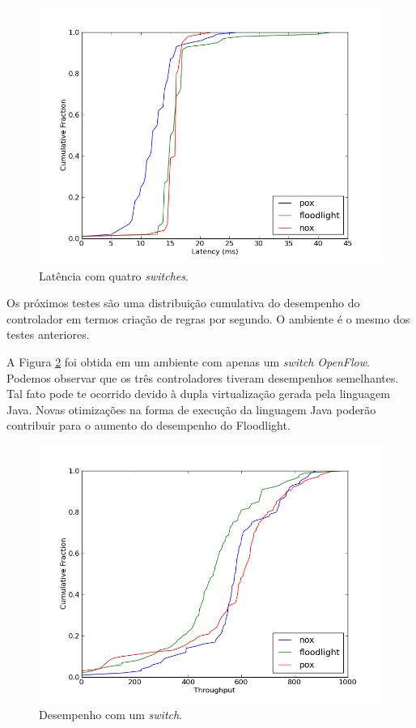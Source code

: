 \begin{figure}[h]
\centering
\includegraphics[width=140mm]{latencia_4sw.png}
\caption{Latência com quatro \textit{switches}.}
\label{fig:latencia4sw} 
\end{figure}

Os próximos testes são uma distribuição cumulativa do
desempenho do controlador em termos criação de regras por
segundo. O ambiente é o mesmo dos testes anteriores.

A Figura \ref{fig:desempenho1sw} foi obtida em um ambiente
com apenas um \textit{switch OpenFlow}. Podemos observar 
que os três controladores tiveram desempenhos semelhantes.
Tal fato pode te ocorrido devido à dupla virtualização gerada
pela linguagem Java. Novas otimizações na forma de execução
da linguagem Java poderão contribuir para o aumento do 
desempenho do Floodlight.

\begin{figure}[h]
\centering
\includegraphics[width=140mm]{desempenho_1sw.png}
\caption{Desempenho com um \textit{switch}.}
\label{fig:desempenho1sw} 
\end{figure}

